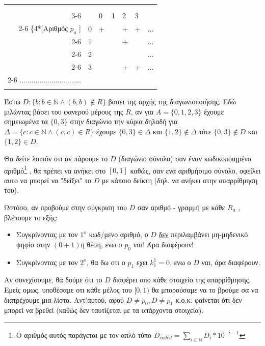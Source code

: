 \documentclass[]{article}
\begin{document}
\begin{center}

\begin{tabular}{rl|l|l|l|l|l}
	\multicolumn{2}{c}{} & \multicolumn{4}{c}{\makebox[0pt]{\footnotesize Θέση Ψηφίου}} \\[-1ex]
	\multicolumn{2}{c}{} & \multicolumn{4}{c}{\downbracefill} \\
	\cline{3-6}
	& & 0 & 1 & 2 & 3 \\ \cline{2-6}
	\ldelim\{{4}{*}[{\footnotesize Αριθμός $p_a$ }] & \multicolumn{1}{|l|}{0} & + &   & + & + & ... \\ \cline{2-6}
	& \multicolumn{1}{|l|}{1} &   &   & + & & ...  \\ \cline{2-6}
	& \multicolumn{1}{|l|}{2} &   &   &   & & ... \\ \cline{2-6}
	& \multicolumn{1}{|l|}{3} &   &   & + & + & ... \\ \cline{2-6}
	\multicolumn{6}{r}{}  ...............................    \\
	\multicolumn{6}{r}{}    ...............................
\end{tabular}

\end{center}
Έστω $D : \{ b : b \in \mathbb{N} \wedge (b,b) \notin R \}$ βασει της αρχής της διαγωνιοποιήσης.
Εδώ μιλώντας βάσει του φανερού μέρους της $R$, αν για $A = \{0,1,2,3\}$ έχουμε σημειωμένα τα $\{0,3\}$ στην διαγώνιο την κύρια δηλαδή για $\Delta = \{ c : c \in \mathbb{N} \wedge (c,c) \in R \}$ έχουμε $\{0,3\} \in \Delta$ και $\{1,2\} \notin \Delta$ τότε $\{0,3\} \notin D$ και $\{1,2\} \in D$.

Θα δείτε λοιπόν οτι αν πάρουμε το $D$ (διαγώνιο σύνολο) σαν έναν κωδικοποιημένο αριθμό\footnote{
Ο αριθμός αυτός παράγεται με τον απλό τύπο $D_{coded} = \sum_{i \in \mathbb{N}} D_i * 10^{-i-1}$ 
} , θα πρέπει να ανήκει στο $[0,1]$ καθώς, σαν ενα αριθμήσιμο σύνολο, οφείλει αυτο να μπορεί να "δείξει" το $D$ με κάποιο δείκτη (δηλ. να ανήκει στην απαρρίθμηση του).

Ωστόσο, αν προβούμε στην σύγκριση του $D$ σαν αριθμό - γραμμή με κάθε $R_a$ , βλέπουμε το εξής:
\begin{itemize}
	\item Συγκρίνοντας με τον $1^\text{ο}$ κωδ/μενο αριθμό, ο $D$ \underline{δεν} περιλαμβάνει μη-μηδενικό ψηφίο στην $(0+1)$η θέση, ενω ο $p_0$ ναι! Άρα διαφέρουν!
	\item Συγκρίνοντας με τον $2^\text{ο}$, θα δω οτι ο $p_1$ εχει $k_1^1 = 0$, ενω ο $D$ ναι, άρα διαφέρουν.
\end{itemize}
Αν συνεχίσουμε, θα δούμε ότι το $D$ διαφέρει απο κάθε στοιχείο της απαρρίθμησης. \\
Εμείς ομως, υποθέσαμε οτι κάθε μέλος του $[0,1)$ θα μπορούσαμε να το βρούμε σα να διατρέχουμε μια λίστα. Αντ'αυτού, αφού $D \neq p_0, D \neq p_1$ κ.ο.κ.  φαίνεται ότι δεν μπορεί να βρεθεί (καθώς δεν ταυτίζεται με τα υπάρχοντα στοιχεία).
\end{document}
